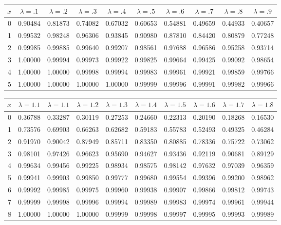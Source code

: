 \def\HEADER{$x$
    &  $\lambda=.1$  &  $\lambda=.2$  &  $\lambda=.3$  &  $\lambda=.4$  &  $\lambda=.5$ 
    &  $\lambda=.6$  &  $\lambda=.7$  &  $\lambda=.8$  &  $\lambda=.9$ \\\hline}

\medskip\begin{tabular}{r|*{9}{c}}
$x$ &  $\lambda=.1$  &  $\lambda=.2$  &  $\lambda=.3$  &  $\lambda=.4$  &  $\lambda=.5$ 
    &  $\lambda=.6$  &  $\lambda=.7$  &  $\lambda=.8$  &  $\lambda=.9$                       \\\hline
  0 & 0.90484 & 0.81873 & 0.74082 & 0.67032 & 0.60653 & 0.54881 & 0.49659 & 0.44933 & 0.40657 \\
  1 & 0.99532 & 0.98248 & 0.96306 & 0.93845 & 0.90980 & 0.87810 & 0.84420 & 0.80879 & 0.77248 \\
  2 & 0.99985 & 0.99885 & 0.99640 & 0.99207 & 0.98561 & 0.97688 & 0.96586 & 0.95258 & 0.93714 \\
  3 & 1.00000 & 0.99994 & 0.99973 & 0.99922 & 0.99825 & 0.99664 & 0.99425 & 0.99092 & 0.98654 \\
  4 & 1.00000 & 1.00000 & 0.99998 & 0.99994 & 0.99983 & 0.99961 & 0.99921 & 0.99859 & 0.99766 \\
  5 & 1.00000 & 1.00000 & 1.00000 & 1.00000 & 0.99999 & 0.99996 & 0.99991 & 0.99982 & 0.99966 \\
\end{tabular}

\myskip
\begin{tabular}{r|*{9}{c}}
$x$ &  $\lambda=1.1$  &  $\lambda=1.1$  &  $\lambda=1.2$  &  $\lambda=1.3$  &  $\lambda=1.4$  
    &  $\lambda=1.5$  &  $\lambda=1.6$  &  $\lambda=1.7$  &  $\lambda=1.8$                    \\\hline
  0 & 0.36788 & 0.33287 & 0.30119 & 0.27253 & 0.24660 & 0.22313 & 0.20190 & 0.18268 & 0.16530 \\
  1 & 0.73576 & 0.69903 & 0.66263 & 0.62682 & 0.59183 & 0.55783 & 0.52493 & 0.49325 & 0.46284 \\
  2 & 0.91970 & 0.90042 & 0.87949 & 0.85711 & 0.83350 & 0.80885 & 0.78336 & 0.75722 & 0.73062 \\
  3 & 0.98101 & 0.97426 & 0.96623 & 0.95690 & 0.94627 & 0.93436 & 0.92119 & 0.90681 & 0.89129 \\
  4 & 0.99634 & 0.99456 & 0.99225 & 0.98934 & 0.98575 & 0.98142 & 0.97632 & 0.97039 & 0.96359 \\
  5 & 0.99941 & 0.99903 & 0.99850 & 0.99777 & 0.99680 & 0.99554 & 0.99396 & 0.99200 & 0.98962 \\
  6 & 0.99992 & 0.99985 & 0.99975 & 0.99960 & 0.99938 & 0.99907 & 0.99866 & 0.99812 & 0.99743 \\
  7 & 0.99999 & 0.99998 & 0.99996 & 0.99994 & 0.99989 & 0.99983 & 0.99974 & 0.99961 & 0.99944 \\
  8 & 1.00000 & 1.00000 & 1.00000 & 0.99999 & 0.99998 & 0.99997 & 0.99995 & 0.99993 & 0.99989 \\
\end{tabular}

